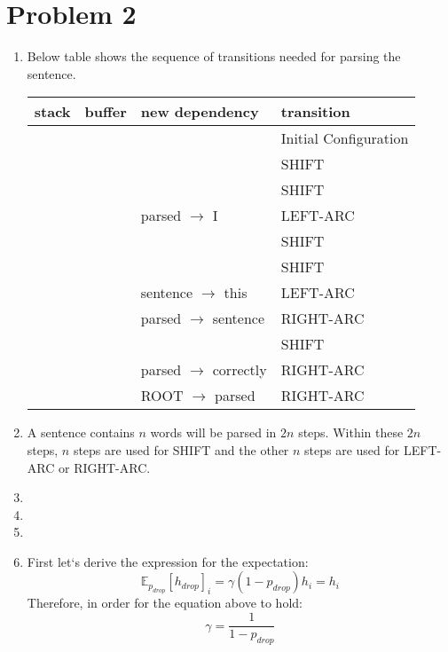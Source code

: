\documentclass[10pt]{article}
\begin{document}
\section*{Problem 2}
\begin{enumerate}[label=(\alph*)]
\item
Below table shows the sequence of transitions needed for parsing the sentence.
\begin{center}
\begin{tabular}{ l | l | l | l}
  stack & buffer & new dependency & transition\\ \hline
   &  &  & Initial Configuration\\
   &  &  & SHIFT\\
   &  &  & SHIFT\\
   &  & parsed $\rightarrow$ I & LEFT-ARC\\
   &  & & SHIFT\\
   &  & & SHIFT\\
   &  & sentence $\rightarrow$ this & LEFT-ARC\\
   &  & parsed $\rightarrow$ sentence & RIGHT-ARC\\
   & \big[ \big] & & SHIFT\\
   & \big[ \big] & parsed $\rightarrow$ correctly & RIGHT-ARC\\
   & \big[ \big] & ROOT $\rightarrow$ parsed & RIGHT-ARC\\
\end{tabular}
\end{center}
\item
A sentence contains $n$ words will be parsed in $2n$ steps.
Within these $2n$ steps, $n$ steps are used for SHIFT and the other $n$ steps are used for LEFT-ARC or RIGHT-ARC.

\item
\item
\item

\item
First let`s derive the expression for the expectation:
\begin{equation*}
	\mathbb{E}_{p_{drop}}[h_{drop}]_i = \gamma(1-p_{drop})h_i = h_i
\end{equation*}
Therefore, in order for the equation above to hold:
\begin{equation}
	\gamma = \frac{1}{1-p_{drop}}
\end{equation}


\end{enumerate}
\end{document}
